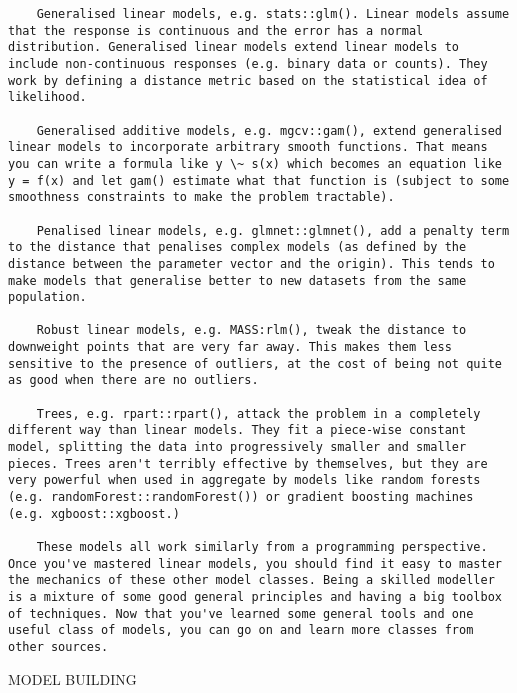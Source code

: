 \documentclass[
]{book}
\begin{document}
\begin{verbatim}
    Generalised linear models, e.g. stats::glm(). Linear models assume that the response is continuous and the error has a normal distribution. Generalised linear models extend linear models to include non-continuous responses (e.g. binary data or counts). They work by defining a distance metric based on the statistical idea of likelihood.

    Generalised additive models, e.g. mgcv::gam(), extend generalised linear models to incorporate arbitrary smooth functions. That means you can write a formula like y \~ s(x) which becomes an equation like y = f(x) and let gam() estimate what that function is (subject to some smoothness constraints to make the problem tractable).

    Penalised linear models, e.g. glmnet::glmnet(), add a penalty term to the distance that penalises complex models (as defined by the distance between the parameter vector and the origin). This tends to make models that generalise better to new datasets from the same population.

    Robust linear models, e.g. MASS:rlm(), tweak the distance to downweight points that are very far away. This makes them less sensitive to the presence of outliers, at the cost of being not quite as good when there are no outliers.

    Trees, e.g. rpart::rpart(), attack the problem in a completely different way than linear models. They fit a piece-wise constant model, splitting the data into progressively smaller and smaller pieces. Trees aren't terribly effective by themselves, but they are very powerful when used in aggregate by models like random forests (e.g. randomForest::randomForest()) or gradient boosting machines (e.g. xgboost::xgboost.)

    These models all work similarly from a programming perspective. Once you've mastered linear models, you should find it easy to master the mechanics of these other model classes. Being a skilled modeller is a mixture of some good general principles and having a big toolbox of techniques. Now that you've learned some general tools and one useful class of models, you can go on and learn more classes from other sources.
\end{verbatim}

MODEL BUILDING
\end{document}
